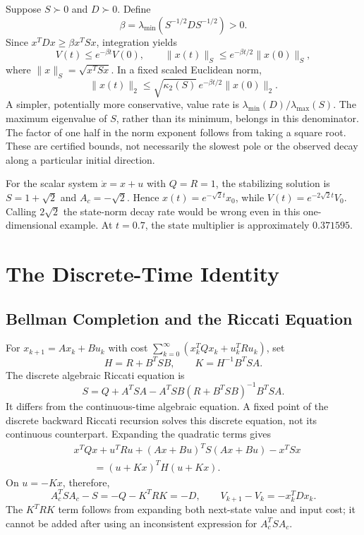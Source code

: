 Suppose $S\succ0$ and $D\succ0$. Define
\begin{equation}
\beta=\lambda_{\min}(S^{-1/2}DS^{-1/2})>0.
\end{equation}
Since $x^TDx\ge\beta x^TSx$, integration yields
\begin{equation}
V(t)\le e^{-\beta t}V(0),\qquad
\|x(t)\|_S\le e^{-\beta t/2}\|x(0)\|_S,
\end{equation}
where $\|x\|_S=\sqrt{x^TSx}$. In a fixed scaled Euclidean norm,
\begin{equation}
\|x(t)\|_2\le\sqrt{\kappa_2(S)}\,
e^{-\beta t/2}\|x(0)\|_2.
\end{equation}
A simpler, potentially more conservative, value rate is $\lambda_{\min}(D)/\lambda_{\max}(S)$. The maximum eigenvalue of $S$, rather than its minimum, belongs in this denominator. The factor of one half in the norm exponent follows from taking a square root. These are certified bounds, not necessarily the slowest pole or the observed decay along a particular initial direction.

For the scalar system $\dot x=x+u$ with $Q=R=1$, the stabilizing solution is $S=1+\sqrt2$ and $A_c=-\sqrt2$. Hence $x(t)=e^{-\sqrt2t}x_0$, while $V(t)=e^{-2\sqrt2t}V_0$. Calling $2\sqrt2$ the state-norm decay rate would be wrong even in this one-dimensional example. At $t=0.7$, the state multiplier is approximately $0.371595$.

\section{The Discrete-Time Identity}

\subsection{Bellman Completion and the Riccati Equation}

For $x_{k+1}=Ax_k+Bu_k$ with cost $\sum_{k=0}^\infty(x_k^TQx_k+u_k^TRu_k)$, set
\begin{equation}
H=R+B^TSB,\qquad K=H^{-1}B^TSA.
\end{equation}
The discrete algebraic Riccati equation is
\begin{equation}
S=Q+A^TSA-A^TSB(R+B^TSB)^{-1}B^TSA.
\end{equation}
It differs from the continuous-time algebraic equation. A fixed point of the discrete backward Riccati recursion solves this discrete equation, not its continuous counterpart. Expanding the quadratic terms gives
\begin{equation}
\begin{aligned}
&x^TQx+u^TRu+(Ax+Bu)^TS(Ax+Bu)-x^TSx\\
&\hspace{2em}=(u+Kx)^TH(u+Kx).
\end{aligned}
\end{equation}
On $u=-Kx$, therefore,
\begin{equation}
A_c^TSA_c-S=-Q-K^TRK=-D,
\qquad V_{k+1}-V_k=-x_k^TDx_k.
\end{equation}
The $K^TRK$ term follows from expanding both next-state value and input cost; it cannot be added after using an inconsistent expression for $A_c^TSA_c$.

